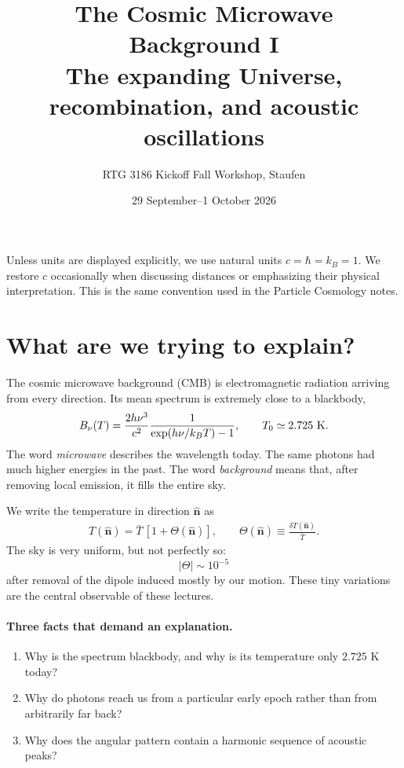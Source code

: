 \documentclass[12pt]{article}
\title{The Cosmic Microwave Background I\\
The expanding Universe, recombination, and acoustic oscillations}
\author{RTG 3186 Kickoff Fall Workshop, Staufen}
\date{29 September--1 October 2026}
\newcommand{\be}{\begin{eqnarray}}
\newcommand{\ee}{\end{eqnarray}}
\newcommand{\bn}{\hat{\mathbf n}}
\begin{document}
\maketitle

\begin{center}
\end{center}

Unless units are displayed explicitly, we use natural units
$c=\hbar=k_B=1$. We restore $c$ occasionally when discussing distances or emphasizing
their physical interpretation. This is the same convention used in the Particle
Cosmology notes.

\section{What are we trying to explain?}

The cosmic microwave background (CMB) is electromagnetic radiation arriving from
every direction. Its mean spectrum is extremely close to a blackbody,
\be
B_\nu(T)=\frac{2h\nu^3}{c^2}\frac{1}{\exp(h\nu/k_BT)-1},
\qquad T_0\simeq 2.725\ {\rm K}.
\ee
The word \emph{microwave} describes the wavelength today. The same photons had much
higher energies in the past. The word \emph{background} means that, after removing
local emission, it fills the entire sky.

We write the temperature in direction $\bn$ as
\be
T(\bn)=\bar T\,[1+\Theta(\bn)],
\qquad \Theta(\bn)\equiv\frac{\delta T(\bn)}{\bar T}.
\ee
The sky is very uniform, but not perfectly so:
\[
|\Theta|\sim10^{-5}
\]
after removal of the dipole induced mostly by our motion. These tiny variations are
the central observable of these lectures.

\paragraph{Three facts that demand an explanation.}
\begin{enumerate}
\item Why is the spectrum blackbody, and why is its temperature only $2.725$ K today?
\item Why do photons reach us from a particular early epoch rather than from arbitrarily far back?
\item Why does the angular pattern contain a harmonic sequence of acoustic peaks?
\end{enumerate}
\end{document}
